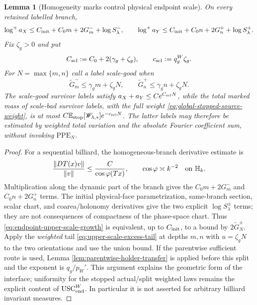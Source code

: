 \documentclass[11pt]{article}
\newtheorem{lemma}[theorem]{Lemma}
\begin{document}
\begin{lemma}[Homogeneity marks control physical endpoint scale]
\label{lem:endpoint-upper-scale}
On every retained labelled branch,
\begin{equation}
\label{eq:endpoint-upper-scale-growth}
 \log^+a_X\le C_{\rm init}+C_0m+2G_m^-+\log S_\lambda^-,
 \qquad
 \log^+a_Y\le C_{\rm init}+C_0n+2G_n^++\log S_\lambda^+.
\end{equation}
Fix $\zeta_g>0$ and put
\begin{equation}
\label{eq:scale-good-constants}
 C_{\rm scl}:=C_0+2(\gamma_g+\zeta_g),\qquad
 c_{\rm scl}:=q_g^W\zeta_g.
\end{equation}
For $N=\max\{m,n\}$ call a label scale-good when
\begin{equation}
\label{eq:weighted-scale-good-event}
 \widetilde G_m^-\le\gamma_gm+\zeta_gN,
 \qquad
 \widetilde G_n^+\le\gamma_gn+\zeta_gN.
\end{equation}
The scale-good survivor labels satisfy
$a_X+a_Y\le Ce^{C_{\rm scl}N}$, while the total marked mass of scale-bad
survivor labels, with the full weight \eqref{eq:global-stopped-source-weight}, is at most
$C\mathbb E_{\rm stop}[\mathscr W_{\lambda,*}]e^{-c_{\rm scl}N}$.  The latter
labels may therefore be estimated by weighted total variation and the
absolute Fourier coefficient sum, without invoking $\mathrm{PPE}_{N}$.
\end{lemma}

\begin{proof}
For a sequential billiard, the homogeneous-branch derivative estimate is
\cite{DLcones}
\[
 \frac{\|DT(x)v\|}{\|v\|}\le\frac{C}{\cos\varphi(Tx)},
 \qquad \cos\varphi\asymp k^{-2}\quad\hbox{on }\mathbb H_k.
\]
Multiplication along the dynamic part of the branch gives the $C_0m+2G_m^-$
and $C_0n+2G_n^+$ terms.  The initial physical-face parametrization,
same-branch section, scalar chart, and coarea/holonomy derivatives give the
two explicit $\log S_\lambda^\pm$ terms; they are not consequences of
compactness of the phase-space chart.  Thus
\eqref{eq:endpoint-upper-scale-growth} is equivalent, up to
$C_{\rm init}$, to a bound by $2\widetilde G_N^\pm$.  Apply the
\emph{weighted} tail \eqref{eq:upper-scale-excess-tail} at depths $m,n$ with
$u=\zeta_gN$ to the two orientations and use the union bound.  If the
parentwise sufficient route is used, Lemma
\ref{lem:parentwise-holder-transfer} is applied before this split and the
exponent is $q_g/p_W'$.  This
argument explains the geometric form of the interface; uniformity for the
stopped actual/split weighted laws remains the explicit content of
$\mathrm{USC}_{\rm end}^{W}$.  In particular it is not asserted for
arbitrary billiard invariant measures.
\end{proof}
\end{document}
